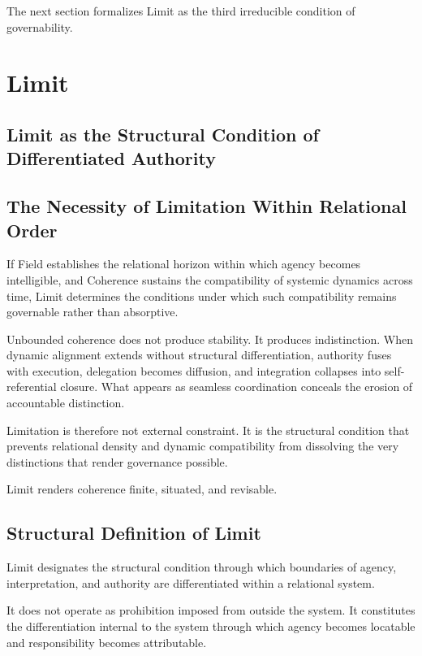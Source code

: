 \documentclass[12pt]{article}
\begin{document}
The next section formalizes Limit as the third irreducible condition of governability.

\section{Limit}


\subsection*{Limit as the Structural Condition of Differentiated Authority}


\subsection{The Necessity of Limitation Within Relational Order}


If Field establishes the relational horizon within which agency becomes intelligible, and Coherence sustains the compatibility of systemic dynamics across time, Limit determines the conditions under which such compatibility remains governable rather than absorptive.

Unbounded coherence does not produce stability. It produces indistinction. When dynamic alignment extends without structural differentiation, authority fuses with execution, delegation becomes diffusion, and integration collapses into self-referential closure. What appears as seamless coordination conceals the erosion of accountable distinction.

Limitation is therefore not external constraint. It is the structural condition that prevents relational density and dynamic compatibility from dissolving the very distinctions that render governance possible.

Limit renders coherence finite, situated, and revisable.

\subsection{Structural Definition of Limit}


Limit designates the structural condition through which boundaries of agency, interpretation, and authority are differentiated within a relational system.

It does not operate as prohibition imposed from outside the system. It constitutes the differentiation internal to the system through which agency becomes locatable and responsibility becomes attributable.
\end{document}
